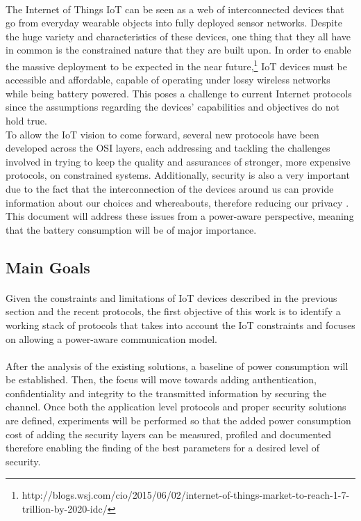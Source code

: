 \paragraph{}The Internet of Things \ac{IoT} can be seen as a web of interconnected devices that go from everyday wearable objects into fully deployed sensor networks. Despite the huge variety and characteristics of these devices, one thing that they all have in common is the constrained nature that they are built upon. In order to enable the massive deployment to be expected in the near future,\footnote{http://blogs.wsj.com/cio/2015/06/02/internet-of-things-market-to-reach-1-7-trillion-by-2020-idc/} \ac{IoT} devices must be accessible and affordable, capable of operating under lossy wireless networks while being battery powered. This poses a challenge to current Internet protocols since the assumptions regarding the devices' capabilities and objectives do not hold true.\\ To allow the \ac{IoT} vision to come forward, several new protocols have been developed across the OSI layers, each addressing and tackling the challenges involved in trying to keep the quality and assurances of stronger, more expensive protocols, on constrained systems.
Additionally, security is also a very important due to the fact that the interconnection of the devices around us can provide information about our choices and whereabouts, therefore reducing our privacy \cite{Ukil2015}.
This document will address these issues from a power-aware perspective, meaning that the battery consumption will be of major importance.

\subsection{Main Goals}

\paragraph{}
Given the constraints and limitations of \ac{IoT} devices described in the previous section and the recent protocols, the first objective of this work is to identify a working stack of protocols that takes into account the \ac{IoT} constraints and focuses on allowing a power-aware communication model.

\paragraph{}
After the analysis of the existing solutions, a baseline of power consumption will be established. Then, the focus will move towards adding authentication, confidentiality and integrity to the transmitted information by securing the channel.
Once both the application level protocols and proper security solutions are defined, experiments will be performed so that the added power consumption cost of adding the security layers can be measured, profiled and documented therefore enabling the finding of the best parameters for a desired level of security.

